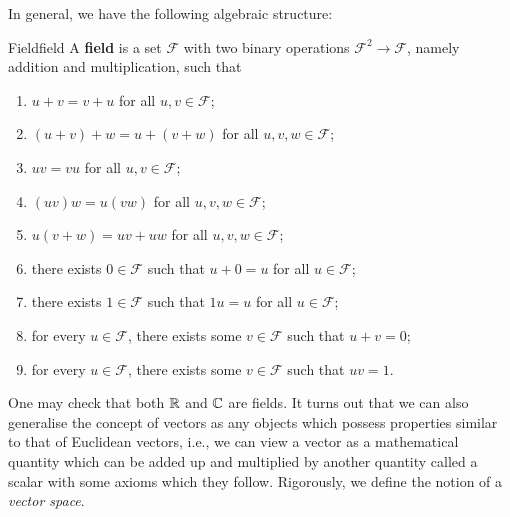 \documentclass[math, code]{amznotes}
\theoremstyle{remark}
\begin{document}
In general, we have the following algebraic structure:
\begin{dfnbox}{Field}{field}
    A {\color{red} \textbf{field}} is a set $\mathcal{F}$ with two binary operations $\mathcal{F}^2 \to \mathcal{F}$, namely addition and multiplication, such that
    \begin{enumerate}
        \item $u + v = v + u$ for all $u, v \in \mathcal{F}$;
        \item $(u + v) + w = u + (v + w)$ for all $u, v, w \in \mathcal{F}$;
        \item $uv = vu$ for all $u, v \in \mathcal{F}$;
        \item $(uv)w = u(vw)$ for all $u, v, w \in \mathcal{F}$;
        \item $u(v + w) = uv + uw$ for all $u, v, w \in \mathcal{F}$;
        \item there exists $0 \in \mathcal{F}$ such that $u + 0 = u$ for all $u \in \mathcal{F}$;
        \item there exists $1 \in \mathcal{F}$ such that $1u = u$ for all $u \in \mathcal{F}$;
        \item for every $u \in \mathcal{F}$, there exists some $v \in \mathcal{F}$ such that $u + v = 0$;
        \item for every $u \in \mathcal{F}$, there exists some $v \in \mathcal{F}$ such that $uv = 1$.
    \end{enumerate}
\end{dfnbox}
One may check that both $\mathbb{R}$ and $\mathbb{C}$ are fields. It turns out that we can also generalise the concept of vectors as any objects which possess properties similar to that of Euclidean vectors, i.e., we can view a vector as a mathematical quantity which can be added up and multiplied by another quantity called a scalar with some axioms which they follow. Rigorously, we define the notion of a \textit{vector space}.
\end{document}
